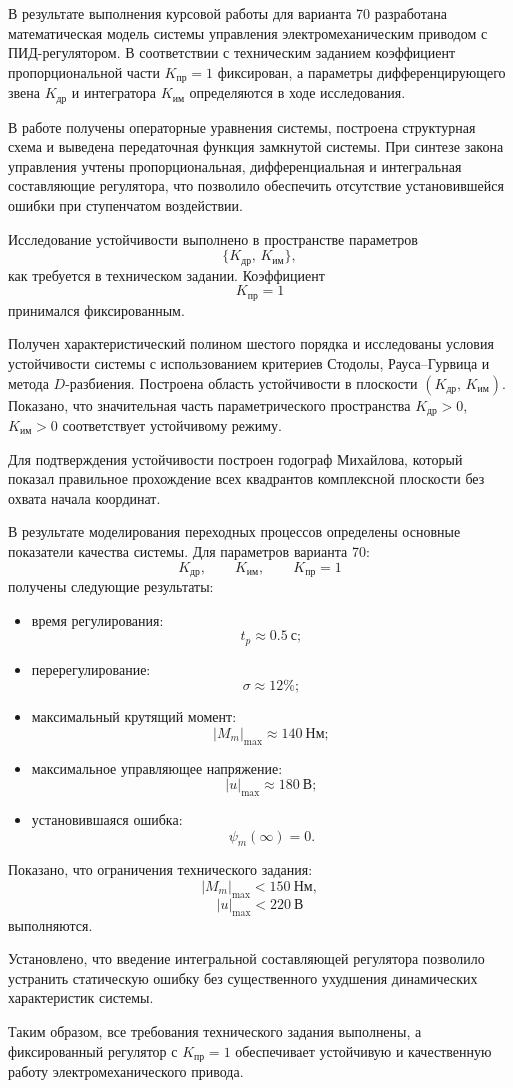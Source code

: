 \documentclass[a4paper, 14pt]{extarticle}
\begin{document}
В результате выполнения курсовой работы для варианта 70 разработана математическая модель системы управления электромеханическим приводом с ПИД-регулятором. В соответствии с техническим заданием коэффициент пропорциональной части $K_{\text{пр}}=1$ фиксирован, а параметры дифференцирующего звена $K_{\text{др}}$ и интегратора $K_{\text{им}}$ определяются в ходе исследования.

В работе получены операторные уравнения системы, построена структурная схема и выведена передаточная функция замкнутой системы. При синтезе закона управления учтены пропорциональная, дифференциальная и интегральная составляющие регулятора, что позволило обеспечить отсутствие установившейся ошибки при ступенчатом воздействии.

Исследование устойчивости выполнено в пространстве параметров
\[
    \{K_{\text{др}},\,K_{\text{им}}\},
\]
как требуется в техническом задании. Коэффициент
\[
    K_{\text{пр}}=1
\]
принимался фиксированным.

Получен характеристический полином шестого порядка и исследованы условия устойчивости системы с использованием критериев Стодолы, Рауса–Гурвица и метода \(D\)-разбиения. Построена область устойчивости в плоскости \((K_{\text{др}},\,K_{\text{им}})\). Показано, что значительная часть параметрического пространства $K_{\text{др}}>0$, $K_{\text{им}}>0$ соответствует устойчивому режиму.

Для подтверждения устойчивости построен годограф Михайлова, который показал правильное прохождение всех квадрантов комплексной плоскости без охвата начала координат.

В результате моделирования переходных процессов определены основные показатели качества системы. Для параметров варианта 70:
\[
    K_{\text{др}},
    \qquad
    K_{\text{им}},
    \qquad
    K_{\text{пр}}=1
\]
получены следующие результаты:
\begin{itemize}
    \item время регулирования:
          \[
              t_p\approx0.5\ \text{с};
          \]
    \item перерегулирование:
          \[
              \sigma\approx12\%;
          \]
    \item максимальный крутящий момент:
          \[
              |M_m|_{\max}\approx140\ \text{Нм};
          \]
    \item максимальное управляющее напряжение:
          \[
              |u|_{\max}\approx180\ \text{В};
          \]
    \item установившаяся ошибка:
          \[
              \psi_m(\infty)=0.
          \]
\end{itemize}

Показано, что ограничения технического задания:
\[
    |M_m|_{\max}<150\ \text{Нм},
\]
\[
    |u|_{\max}<220\ \text{В}
\]
выполняются.

Установлено, что введение интегральной составляющей регулятора позволило устранить статическую ошибку без существенного ухудшения динамических характеристик системы.

Таким образом, все требования технического задания выполнены, а фиксированный регулятор с $K_{\text{пр}}=1$ обеспечивает устойчивую и качественную работу электромеханического привода.
\end{document}
